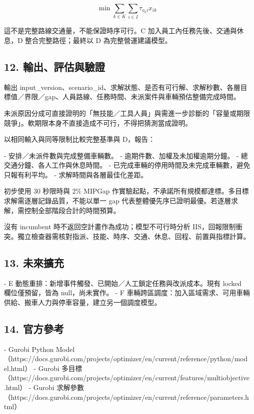 \documentclass[UTF8,fontset=fandol]{ctexart}
\begin{document}
\[
\min\sum_{k\in K}\sum_{i\in I}\tau_{o_ki}x_{ik}
\]

這不是完整路線交通量，不能保證時序可行。C 加入員工內任務先後、交通與休息，D 整合完整路徑；最終以 D 為完整營運建議模型。

\subsection*{12. 輸出、評估與驗證}

輸出 input\_version、scenario\_id、求解狀態、是否有可行解、求解秒數、各層目標值／界限／gap、人員路線、任務時間、未派案件與車輛預估整備完成時間。

未派原因分成可直接證明的「無技能／工具人員」與需進一步診斷的「容量或期限競爭」。軟期限本身不直接造成不可行，不得把猜測當成證明。

以相同輸入與同等限制比較完整基準與 D，報告：

- 安排／未派件數與完成整備車輛數。
- 逾期件數、加權及未加權逾期分鐘。
- 總交通分鐘、各人工作與休息時間。
- 已完成車輛的停用時間及未完成車輛數，避免只報有利平均。
- 求解時間與各層最佳化差距。

初步使用 30 秒限時與 2\% MIPGap 作實驗起點，不承諾所有規模都達標。多目標求解需逐層記錄品質，不能以單一 gap 代表整體優先序已證明最優。若逐層求解，需控制全部階段合計的時間預算。

沒有 incumbent 時不返回空計畫作為成功；模型不可行時分析 IIS，回報限制衝突。獨立檢查器需核對指派、技能、時序、交通、休息、回程、前置與指標計算。

\subsection*{13. 未來擴充}

- E 動態重排：新增事件觸發、已開始／人工鎖定任務與改派成本。現有 locked 欄位僅預留，皆為 null，尚未實作。
- F 車輛跨區調度：加入區域需求、可用車輛供給、搬車人力與停車容量，建立另一個調度模型。

\subsection*{14. 官方參考}

- Gurobi Python Model（https://docs.gurobi.com/projects/optimizer/en/current/reference/python/model.html）
- Gurobi 多目標（https://docs.gurobi.com/projects/optimizer/en/current/features/multiobjective.html）
- Gurobi 求解參數（https://docs.gurobi.com/projects/optimizer/en/current/reference/parameters.html）
\end{document}
